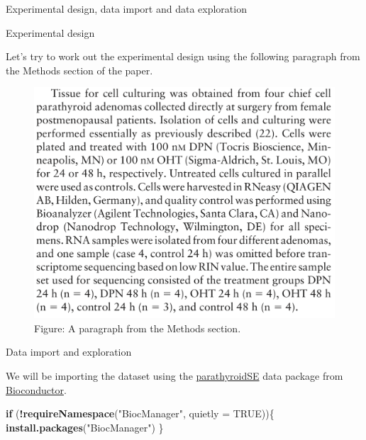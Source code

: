 \documentclass[ignorenonframetext,]{beamer}
\newenvironment{Shaded}{\begin{snugshade}}{\end{snugshade}}
\newcommand{\ControlFlowTok}[1]{\textcolor[rgb]{0.13,0.29,0.53}{\textbf{#1}}}
\newcommand{\DataTypeTok}[1]{\textcolor[rgb]{0.13,0.29,0.53}{#1}}
\newcommand{\KeywordTok}[1]{\textcolor[rgb]{0.13,0.29,0.53}{\textbf{#1}}}
\newcommand{\NormalTok}[1]{#1}
\newcommand{\OperatorTok}[1]{\textcolor[rgb]{0.81,0.36,0.00}{\textbf{#1}}}
\newcommand{\OtherTok}[1]{\textcolor[rgb]{0.56,0.35,0.01}{#1}}
\newcommand{\StringTok}[1]{\textcolor[rgb]{0.31,0.60,0.02}{#1}}
\begin{document}
\begin{frame}[fragile]{Experimental design, data import and data
exploration}
\protect\hypertarget{experimental-design-data-import-and-data-exploration}{}

\begin{block}{Experimental design}

Let's try to work out the experimental design using the following
paragraph from the Methods section of the paper.

\begin{figure}
\includegraphics[width=19.14in]{./images_sequencing/expDesign_para} \caption{Figure: A paragraph from the Methods section.}\label{fig:unnamed-chunk-2}
\end{figure}

\end{block}

\begin{block}{Data import and exploration}

We will be importing the dataset using the
\href{https://www.bioconductor.org/packages/release/data/experiment/html/parathyroidSE.html}{parathyroidSE}
data package from \href{https://bioconductor.org/}{Bioconductor}.

\begin{Shaded}
\begin{Highlighting}[]
\ControlFlowTok{if}\NormalTok{ (}\OperatorTok{!}\KeywordTok{requireNamespace}\NormalTok{(}\StringTok{"BiocManager"}\NormalTok{, }\DataTypeTok{quietly =} \OtherTok{TRUE}\NormalTok{))\{}
  \KeywordTok{install.packages}\NormalTok{(}\StringTok{"BiocManager"}\NormalTok{)}
\NormalTok{\}}
\end{Highlighting}
\end{Shaded}


\end{block}
\end{frame}
\end{document}
